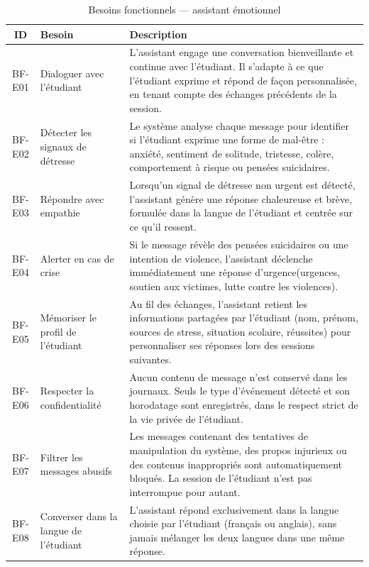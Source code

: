 \vspace{6pt}
\begin{table}[H]
\caption{Besoins fonctionnels — assistant émotionnel}
\label{tab:bf_emo}
\centering
\small
\setlength{\tabcolsep}{4pt}
\begin{tabular}{|c|p{3.5cm}|p{9.5cm}|}
\hline
\textbf{ID} & \textbf{Besoin} & \textbf{Description} \\
\hline
BF-E01 & Dialoguer avec l'étudiant
        & L'assistant engage une conversation bienveillante et continue avec l'étudiant. Il s'adapte à ce que l'étudiant exprime et répond de façon personnalisée, en tenant compte des échanges précédents de la session. \\
\hline
BF-E02 & Détecter les signaux de détresse
        & Le système analyse chaque message pour identifier si l'étudiant exprime une forme de mal-être : anxiété, sentiment de solitude, tristesse, colère, comportement à risque ou pensées suicidaires. \\
\hline
BF-E03 & Répondre avec empathie
        & Lorsqu'un signal de détresse non urgent est détecté, l'assistant génère une réponse chaleureuse et brève, formulée dans la langue de l'étudiant et centrée sur ce qu'il ressent. \\
\hline
BF-E04 & Alerter en cas de crise
        & Si le message révèle des pensées suicidaires ou une intention de violence, l'assistant déclenche immédiatement une réponse d'urgence(urgences, soutien aux victimes, lutte contre les violences). \\
\hline
BF-E05 & Mémoriser le profil de l'étudiant
        & Au fil des échanges, l'assistant retient les informations partagées par l'étudiant (nom, prénom, sources de stress, situation scolaire, réussites) pour personnaliser ses réponses lors des sessions suivantes. \\
\hline
BF-E06 & Respecter la confidentialité
        & Aucun contenu de message n'est conservé dans les journaux. Seuls le type d'événement détecté et son horodatage sont enregistrés, dans le respect strict de la vie privée de l'étudiant. \\
\hline
BF-E07 & Filtrer les messages abusifs
        & Les messages contenant des tentatives de manipulation du système, des propos injurieux ou des contenus inappropriés sont automatiquement bloqués. La session de l'étudiant n'est pas interrompue pour autant. \\
\hline
BF-E08 & Converser dans la langue de l'étudiant
        & L'assistant répond exclusivement dans la langue choisie par l'étudiant (français ou anglais), sans jamais mélanger les deux langues dans une même réponse. \\
\hline
\end{tabular}
\end{table}

